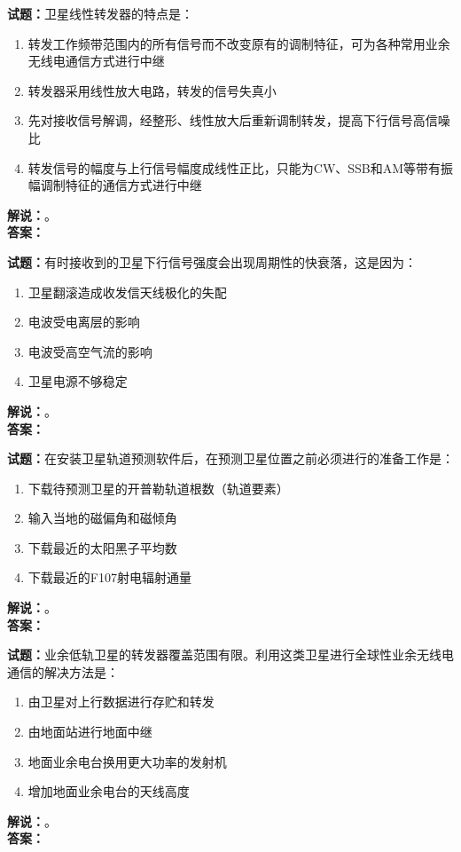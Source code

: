 \documentclass{ctexbook}
\begin{document}
\bigskip




\noindent\textbf{试题：}卫星线性转发器的特点是：
\begin{enumerate}[leftmargin=3em]
\item 转发工作频带范围内的所有信号而不改变原有的调制特征，可为各种常用业余无线电通信方式进行中继
\item 转发器采用线性放大电路，转发的信号失真小
\item 先对接收信号解调，经整形、线性放大后重新调制转发，提高下行信号高信噪比
\item 转发信号的幅度与上行信号幅度成线性正比，只能为CW、SSB和AM等带有振幅调制特征的通信方式进行中继
\end{enumerate}
\noindent\textbf{解说：}\textbf{}。\\\noindent\textbf{答案：}

\bigskip




\noindent\textbf{试题：}有时接收到的卫星下行信号强度会出现周期性的快衰落，这是因为：
\begin{enumerate}[leftmargin=3em]
\item 卫星翻滚造成收发信天线极化的失配
\item 电波受电离层的影响
\item 电波受高空气流的影响
\item 卫星电源不够稳定
\end{enumerate}
\noindent\textbf{解说：}\textbf{}。\\\noindent\textbf{答案：}

\bigskip




\noindent\textbf{试题：}在安装卫星轨道预测软件后，在预测卫星位置之前必须进行的准备工作是：
\begin{enumerate}[leftmargin=3em]
\item 下载待预测卫星的开普勒轨道根数（轨道要素）
\item 输入当地的磁偏角和磁倾角
\item 下载最近的太阳黑子平均数
\item 下载最近的F107射电辐射通量
\end{enumerate}
\noindent\textbf{解说：}\textbf{}。\\\noindent\textbf{答案：}

\bigskip




\noindent\textbf{试题：}业余低轨卫星的转发器覆盖范围有限。利用这类卫星进行全球性业余无线电通信的解决方法是：
\begin{enumerate}[leftmargin=3em]
\item 由卫星对上行数据进行存贮和转发
\item 由地面站进行地面中继
\item 地面业余电台换用更大功率的发射机
\item 增加地面业余电台的天线高度
\end{enumerate}
\noindent\textbf{解说：}\textbf{}。\\\noindent\textbf{答案：}
\end{document}
